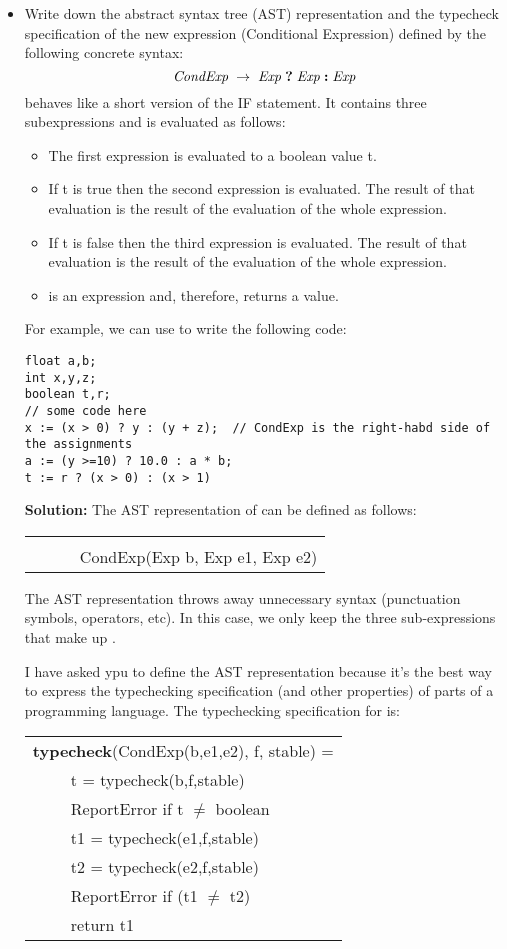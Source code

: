 \documentclass{article}
\begin{document}
\begin{itemize} 

\item Write down the abstract syntax tree (AST) representation and the typecheck specification of the new expression  (Conditional Expression) defined by the following concrete syntax:
$$
\mathit{CondExp} \;\rightarrow\; \mathit{Exp} \;\textbf{?}\; \mathit{Exp} \;\textbf{:}\; \mathit{Exp}
$$
 behaves like a short version of the IF statement. It contains three subexpressions and is evaluated as follows:
\begin{itemize}
\item The first expression is evaluated to a boolean value t.
\item If t is true then the second expression is evaluated. The result of that evaluation is the result of the evaluation of the whole expression.
\item If t is false then the third expression is evaluated. The result of that evaluation is the result of the evaluation of the whole expression.
\item {} is an expression and, therefore, returns a value.
\end{itemize}

For example, we can use  to write the following code:
\begin{verbatim}
float a,b;
int x,y,z;
boolean t,r;
// some code here
x := (x > 0) ? y : (y + z);  // CondExp is the right-habd side of the assignments
a := (y >=10) ? 10.0 : a * b;
t := r ? (x > 0) : (x > 1)
\end{verbatim}

\textbf{Solution:} The AST representation of  can be defined as follows:

\begin{tabular}{ll}
$\;\;\;\;\;\;\;$ & \\
& CondExp(Exp b, Exp e1, Exp e2)
\end{tabular}

The AST representation throws away unnecessary syntax (punctuation symbols, operators, etc). In this case, we only keep the three sub-expressions that make up .

I have asked ypu to define the AST representation because it's the best way to express the typechecking specification (and other properties) of parts of a programming language. The typechecking specification for  is:

\begin{tabular}{ll}
\multicolumn{2}{l}{\textbf{typecheck}(CondExp(b,e1,e2), f, stable) =} \\
$\;\;\;$ & t = typecheck(b,f,stable) \\
& ReportError if t $\neq$ boolean \\
& t1 = typecheck(e1,f,stable) \\
& t2 = typecheck(e2,f,stable) \\
& ReportError if (t1 $\neq$ t2) \\
& return t1
\end{tabular}


\end{itemize}
\end{document}
